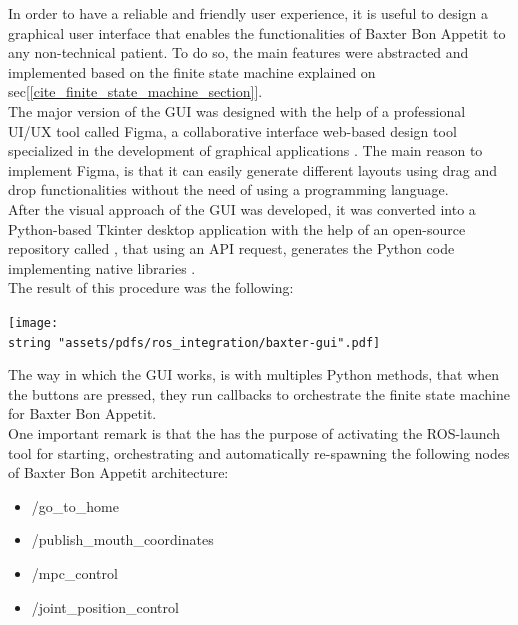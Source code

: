 \documentclass[11pt]{report} %
\begin{document}
In order to have a reliable and friendly user experience, it is useful to design a graphical user interface that enables the functionalities of Baxter Bon Appetit to any non-technical patient. To do so, the main features were abstracted and implemented based on the finite state machine explained on sec[\ref{cite_finite_state_machine_section}].\\

The major version of the GUI was designed with the help of a professional UI/UX tool called Figma, a collaborative interface web-based design tool specialized in the development of graphical applications \citep{cite_figma}. The main reason to implement Figma, is that it can easily generate different layouts using drag and drop functionalities without the need of using a programming language. \\

After the visual approach of the GUI was developed, it was converted into a Python-based Tkinter desktop application with the help of an open-source repository called , that using an API request, generates the Python code implementing native libraries \citep{cite_Tkinter-Designer}. \\

The result of this procedure was the following:

\begin{center}
\texttt{[image: \\string "assets/pdfs/ros\_integration/baxter-gui".pdf]}
\bigbreak
\begin{minipage}{\linewidth} %
\label{fig_baxter_gui}
\end{minipage} \end{center}

The way in which the GUI works, is with multiples Python methods, that when the buttons are pressed, they run callbacks to orchestrate the finite state machine for Baxter Bon Appetit. \\

One important remark is that the  has the purpose of activating the ROS-launch tool for starting, orchestrating and automatically re-spawning the following nodes of Baxter Bon Appetit architecture:

\begin{itemize}
    \item /go\_to\_home
    \item /publish\_mouth\_coordinates
    \item /mpc\_control
    \item /joint\_position\_control
\end{itemize}
\end{document}
